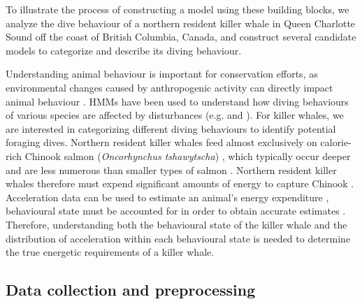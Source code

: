 

To illustrate the process of constructing a model using these building blocks, we analyze the dive behaviour of a northern resident killer whale in Queen Charlotte Sound off the coast of British Columbia, Canada, and construct several candidate models to categorize and describe its diving behaviour.

Understanding animal behaviour is important for conservation efforts, as environmental changes caused by anthropogenic activity can directly impact animal behaviour \citep{Sutherland:1998}. HMMs have been used to understand how diving behaviours of various species are affected by disturbances (e.g. \citet{DeRuiter:2017} and \citet{Isojunno:2017}). For killer whales, we are interested in categorizing different diving behaviours to identify potential foraging dives. Northern resident killer whales feed almost exclusively on calorie-rich Chinook salmon (\textit{Oncorhynchus tshawytscha}) \citep{Ford:2006}, which typically occur deeper and are less numerous than smaller types of salmon \citep{Ford:2009}. Northern resident killer whales therefore must expend significant amounts of energy to capture Chinook \citep{Williams:2009,Noren:2011,Wright:2017}. 
Acceleration data can be used to estimate an animal's energy expenditure \citep{Green:2009,Wilson:2019}, behavioural state must be accounted for in order to obtain accurate estimates \citep{Dot:2016}. Therefore, understanding both the behavioural state of the killer whale and the distribution of acceleration within each behavioural state is needed to determine the true energetic requirements of a killer whale.

\subsection{Data collection and preprocessing}

